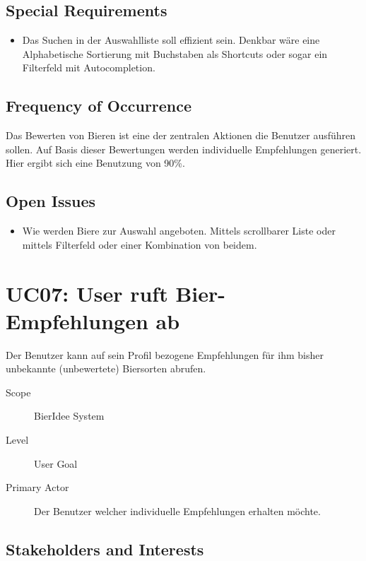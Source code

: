 \documentclass[10pt,a4paper]{scrartcl}
\begin{document}
\subsection*{Special Requirements}

\begin{itemize}
\item Das Suchen in der Auswahlliste soll effizient sein. Denkbar wäre eine Alphabetische Sortierung mit Buchstaben als Shortcuts oder sogar ein Filterfeld mit Autocompletion.
\end{itemize}


\subsection*{Frequency of Occurrence}

Das Bewerten von Bieren ist eine der zentralen Aktionen die Benutzer ausführen sollen.
Auf Basis dieser Bewertungen werden individuelle Empfehlungen generiert. Hier ergibt sich eine Benutzung von 90\%.

\subsection*{Open Issues}

\begin{itemize}
\item Wie werden Biere zur Auswahl angeboten. Mittels scrollbarer Liste oder mittels Filterfeld oder einer Kombination von beidem.
\end{itemize}



\section*{UC07: User ruft Bier-Empfehlungen ab}
Der Benutzer kann auf sein Profil bezogene Empfehlungen für ihm bisher unbekannte (unbewertete) Biersorten abrufen.

\begin{description}
\item[Scope] BierIdee System
\item[Level] User Goal
\item[Primary Actor] Der Benutzer welcher individuelle Empfehlungen erhalten möchte.
\end{description}


\subsection*{Stakeholders and Interests}
\end{document}
